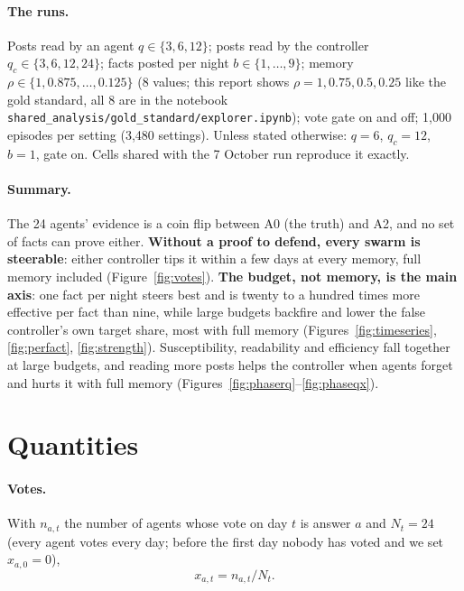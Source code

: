 \documentclass[10pt,a4paper]{article}
\begin{document}
\paragraph{The runs.} Posts read by an agent $q \in \{3, 6, 12\}$; posts read by the controller
$q_c \in \{3, 6, 12, 24\}$; facts posted per night $b \in \{1, \dots, 9\}$; memory $\rho \in \{1, 0.875, \dots,
0.125\}$ (8 values; this report shows $\rho = 1, 0.75, 0.5, 0.25$ like the gold standard, all 8 are in the notebook
\texttt{shared\_analysis/gold\_standard/explorer.ipynb}); vote gate on and off; 1{,}000 episodes per setting
(3{,}480 settings). Unless stated otherwise: $q = 6$, $q_c = 12$, $b = 1$, gate on. Cells shared with the
7 October run reproduce it exactly.

\paragraph{Summary.} The 24 agents' evidence is a coin flip between A0 (the truth) and A2, and no set of facts can
prove either. \textbf{Without a proof to defend, every swarm is steerable}: either controller tips it within a few
days at every memory, full memory included (Figure~\ref{fig:votes}). \textbf{The budget, not memory, is the main
axis}: one fact per night steers best and is twenty to a hundred times more effective per fact than nine, while large
budgets backfire and lower the false controller's own target share, most with full memory
(Figures~\ref{fig:timeseries}, \ref{fig:perfact}, \ref{fig:strength}). Susceptibility, readability and efficiency fall
together at large budgets, and reading more posts helps the controller when agents forget and hurts it with full memory
(Figures~\ref{fig:phaserq}--\ref{fig:phaseqx}).

\section{Quantities}\label{sec:quantities}

\paragraph{Votes.} With $n_{a,t}$ the number of agents whose vote on day $t$ is answer $a$ and $N_t = 24$ (every
agent votes every day; before the first day nobody has voted and we set $x_{a,0} = 0$),
\begin{equation}\label{eq:share}
x_{a,t} = n_{a,t}/N_t .
\end{equation}
\end{document}
